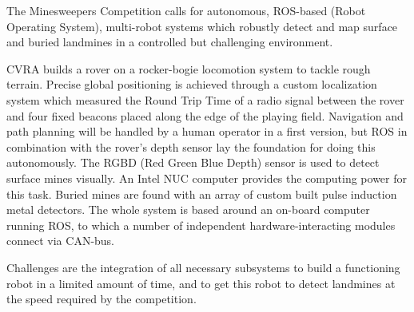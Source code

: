 The Minesweepers Competition calls for autonomous, ROS-based (Robot Operating System), multi-robot systems which robustly detect and map surface and buried landmines in a controlled but challenging environment.

CVRA builds a rover on a rocker-bogie locomotion system to tackle rough terrain.
Precise global positioning is achieved through a custom localization system which measured the Round Trip Time of a radio signal between the rover and four fixed beacons placed along the edge of the playing field.
Navigation and path planning will be handled by a human operator in a first version, but ROS in combination with the rover's depth sensor lay the foundation for doing this autonomously.  
The RGBD (Red Green Blue Depth) sensor is used to detect surface mines visually.
An Intel NUC computer provides the computing power for this task.  
Buried mines are found with an array of custom built pulse induction metal detectors.
The whole system is based around an on-board computer running ROS, to which a number of independent hardware-interacting modules connect via CAN-bus.

Challenges are the integration of all necessary subsystems to build a functioning robot in a limited amount of time, and to get this robot to detect landmines at the speed required by the competition.
